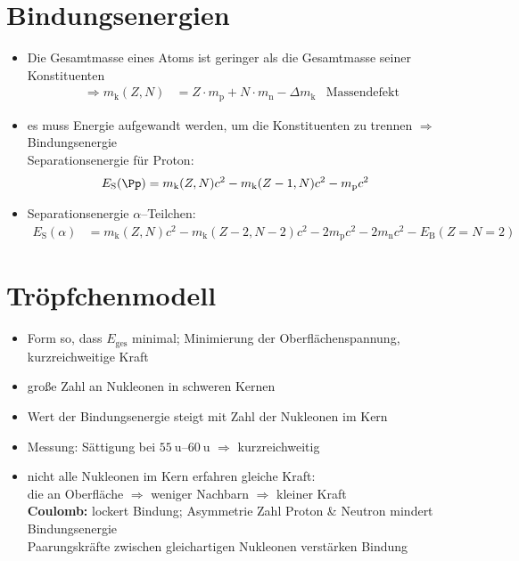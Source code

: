 \documentclass[BCOR=5mm,DIV=calc,listof=totoc,headings=big]{scrartcl}
\begin{document}
\section{Bindungsenergien}
\label{sec:bindungsenergien}
\begin{itemize}
\item Die Gesamtmasse eines Atoms ist geringer als die Gesamtmasse
  seiner Konstituenten
  \begin{align*}
    \Rightarrow m_{\mathrm{k}}(Z,N)&=Z \cdot m_{\mathrm{p}} + N \cdot
    m_{\mathrm{n}} - \Delta m_{\mathrm{k}} & \text{Massendefekt}
  \end{align*}
\item es muss Energie aufgewandt werden, um die Konstituenten zu
  trennen $\Rightarrow$ Bindungsenergie\\
  Separationsenergie für Proton:
  \begin{align*}
    E_{\mathrm{S}}(\Pp)&=m_{\mathrm{k}}(Z,N)c^{2}-m_{\mathrm{k}}(Z-1,N)c^{2}-m_{\mathrm{p}}c^{2}
  \end{align*}
\item Separationsenergie $\alpha$--Teilchen:
  \begin{align*}
    E_{\mathrm{S}}(\alpha)&=m_{\mathrm{k}}(Z,N)c^{2}-m_{\mathrm{k}}(Z-2,N-2)c^{2}-2m_{\mathrm{p}}c^{2}-2m_{\mathrm{n}}c^{2}-E_{\mathrm{B}}(Z=N=2)
  \end{align*}
\end{itemize}

\section{Tröpfchenmodell}
\label{sec:tropfchenmodell}
\begin{itemize}
\item Form so, dass $E_{\text{ges}}$ minimal; Minimierung der
  Oberflächenspannung, kurzreichweitige Kraft
\item große Zahl an Nukleonen in schweren Kernen
\item Wert der Bindungsenergie steigt mit Zahl der Nukleonen im Kern
\item Messung: Sättigung bei $\SIrange{55}{60}{\amu}$ $\Rightarrow$ kurzreichweitig
\item nicht alle Nukleonen im Kern erfahren gleiche Kraft:\\
  die an Oberfläche $\Rightarrow$ weniger Nachbarn $\Rightarrow$
  kleiner Kraft\\
  \textbf{Coulomb:} lockert Bindung; Asymmetrie Zahl Proton \& Neutron
  mindert Bindungsenergie\\
  Paarungskräfte zwischen gleichartigen Nukleonen verstärken Bindung
\end{itemize}
\end{document}
